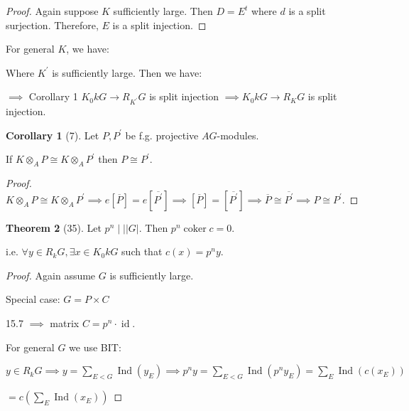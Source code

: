 \documentclass{article}
\theoremstyle{definition}
\newtheorem{theorem}{Theorem}
\newtheorem{corollary}[theorem]{Corollary}
\begin{document}
\begin{proof}
    Again suppose \(K\) sufficiently large. Then \(D = E^t\) where \(d\) is a split surjection. Therefore, \(E\) is a split injection.
\end{proof}

For general \(K\), we have:

\begin{center}
\end{center}

Where \(K^{\prime}\) is sufficiently large. Then we have:

\begin{center}
\end{center}

\(\implies\) Corollary 1 \(K_0 k G \to R_{K^{\prime}} G\) is split injection \(\implies K_0 k G \to R_K G\) is split injection. 

\begin{corollary}
    [7] Let \(P, P^{\prime}\) be f.g. projective \(AG\)-modules.

    If \(K \otimes_A P \cong K \otimes_{A} P^{\prime}\) then \(P \cong P^{\prime}\).
\end{corollary}

\begin{proof}
    \(K \otimes_{A} P \cong K \otimes_{A} P^{\prime} \implies e[\overline{P}] = e[\overline{P^{\prime}}] \implies [\overline{P}] = [\overline{P^{\prime}}] \implies \overline{P} \cong \overline{P^{\prime}} \implies P \cong P^{\prime}\). 
\end{proof}

\begin{theorem}
    [35]
    Let \(p^n \mid \mid \vert G \vert\). Then \(p^n \operatorname{coker} c = 0\).

    i.e. \(\forall y\in R_k G, \exists x\in K_0 k G\) such that \(c(x) = p^n y\).
\end{theorem}

\begin{proof}
    Again assume \(G\) is sufficiently large.

    Special case: \(G = P \times C\) 
    
    15.7 \(\implies\) matrix \(C = p^n \cdot \operatorname{id}\).

    For general \(G\) we use BIT:

    \(y\in R_k G \implies y = \sum_{E < G} \operatorname{Ind} (y_E) \implies p^n y = \sum_{E < G} \operatorname{Ind} (p^n y_E) = \sum_{E} \operatorname{Ind} (c(x_E))\)
    
    \(= c \left( \sum_{E} \operatorname{Ind} (x_E) \right)  \) 
\end{proof}
\end{document}
